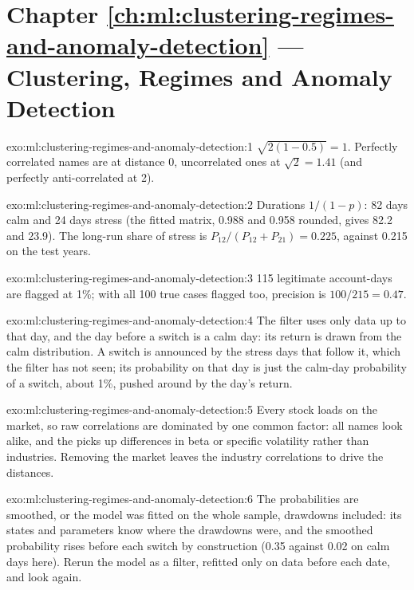 \section*{Chapter \ref{ch:ml:clustering-regimes-and-anomaly-detection} --- Clustering, Regimes and Anomaly Detection}

\begin{solution}{exo:ml:clustering-regimes-and-anomaly-detection:1}
$\sqrt{2(1 - 0.5)} = 1$. Perfectly correlated names are at distance 0, uncorrelated ones at $\sqrt2 = 1.41$ (and perfectly
anti-correlated at 2).
\end{solution}

\begin{solution}{exo:ml:clustering-regimes-and-anomaly-detection:2}
Durations $1/(1 - p)$: 82 days calm and 24 days stress (the fitted matrix, 0.988 and 0.958 rounded, gives 82.2 and 23.9). The
long-run share of stress is $P_{12}/(P_{12} + P_{21}) = 0.225$, against 0.215 on the test years.
\end{solution}

\begin{solution}{exo:ml:clustering-regimes-and-anomaly-detection:3}
115 legitimate account-days are flagged at 1\%; with all 100 true cases flagged too, precision is $100/215 = 0.47$.
\end{solution}

\begin{solution}{exo:ml:clustering-regimes-and-anomaly-detection:4}
The filter uses only data up to that day, and the day before a switch is a calm day: its return is drawn from the calm
distribution. A switch is announced by the stress days that follow it, which the filter has not seen; its probability on
that day is just the calm-day probability of a switch, about 1\%, pushed around by the day's return.
\end{solution}

\begin{solution}{exo:ml:clustering-regimes-and-anomaly-detection:5}
Every stock loads on the market, so raw correlations are dominated by one common factor: all names look alike, and the
 picks up differences in beta or specific volatility rather than industries. Removing the market leaves the
industry correlations to drive the distances.
\end{solution}

\begin{solution}{exo:ml:clustering-regimes-and-anomaly-detection:6}
The probabilities are smoothed, or the model was fitted on the whole sample, drawdowns included: its states and parameters know
where the drawdowns were, and the smoothed probability rises before each switch by construction (0.35 against 0.02 on calm
days here). Rerun the model as a filter, refitted only on data before each date, and look again.
\end{solution}

